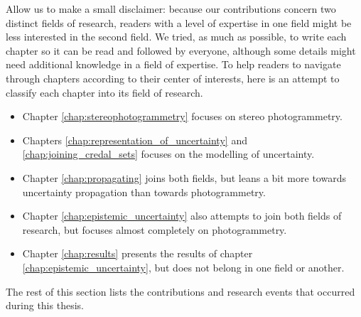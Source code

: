Allow us to make a small disclaimer: because our contributions concern two distinct fields of research, readers with a level of expertise in one field might be less interested in the second field. We tried, as much as possible, to write each chapter so it can be read and followed by everyone, although some details might need additional knowledge in a field of expertise. To help readers to navigate through chapters according to their center of interests, here is an attempt to classify each chapter into its field of research.
\begin{itemize}
    \item Chapter \ref{chap:stereophotogrammetry} focuses on stereo photogrammetry.
    \item Chapters \ref{chap:representation_of_uncertainty} and \ref{chap:joining_credal_sets} focuses on the modelling of uncertainty.
    \item Chapter \ref{chap:propagating} joins both fields, but leans a bit more towards uncertainty propagation than towards photogrammetry. 
    \item Chapter \ref{chap:epistemic_uncertainty} also attempts to join both fields of research, but focuses almost completely on photogrammetry.
    \item Chapter \ref{chap:results} presents the results of chapter \ref{chap:epistemic_uncertainty}, but does not belong in one field or another.
\end{itemize}

The rest of this section lists the contributions and research events that occurred during this thesis.

